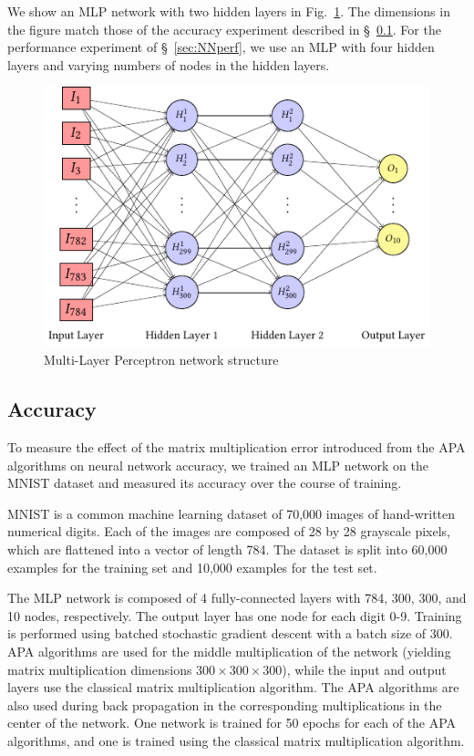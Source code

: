 \documentclass[manuscript]{acmart}
\begin{document}
We show an MLP network with two hidden layers in Fig.~\ref{fig:neuralnet}.
The dimensions in the figure match those of the accuracy experiment described in \S~\ref{sec:NNacc}.
For the performance experiment of \S~\ref{sec:NNperf}, we use an MLP with four hidden layers and varying numbers of nodes in the hidden layers.

\begin{figure}
\centering
%
\includegraphics{tikz-taps/paper-figure7.pdf}
\caption{Multi-Layer Perceptron network structure}
\label{fig:neuralnet}
\end{figure}

\subsection{Accuracy}
\label{sec:NNacc}

To measure the effect of the matrix multiplication error introduced from the APA algorithms on neural network accuracy, we trained an MLP network on the MNIST dataset \cite{LBBH98} and measured its accuracy over the course of training. 

MNIST is a common machine learning dataset of 70,000 images of hand-written numerical digits. 
Each of the images are composed of 28 by 28 grayscale pixels, which are flattened into a vector of length 784.
The dataset is split into 60,000 examples for the training set and 10,000 examples for the test set. 

The MLP network is composed of 4 fully-connected layers with 784, 300, 300, and 10 nodes, respectively.  
The output layer has one node for each digit 0-9. 
Training is performed using batched stochastic gradient descent with a batch size of 300.
APA algorithms are used for the middle multiplication of the network (yielding matrix multiplication dimensions $300\times 300\times300$), while the input and output layers use the classical matrix multiplication algorithm. 
The APA algorithms are also used during back propagation in the corresponding multiplications in the center of the network.
One network is trained for 50 epochs for each of the APA algorithms, and one is trained using the classical matrix multiplication algorithm.
\end{document}

